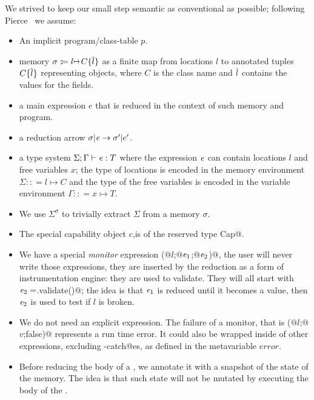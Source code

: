 \noindent We strived to keep our small step semantic as conventional as possible; following Pierce~\cite{pierce2002types} we assume:
\begin{itemize}
\item An implicit program/class-table $p$.
\item memory $\sigma:\!:\!= l\mapsto C\{\Many{l}\}$ as a finite map from locations $l$ to annotated tuples $C\{\hspace{0.03ex} \overline{\hspace{-0.03ex}l\hspace{-0.03ex}} \hspace{0.03ex}\}$ representing objects,
where $C$ is the class name and $\hspace{0.03ex} \overline{\hspace{-0.03ex}l\hspace{-0.03ex}} \hspace{0.03ex}$ contains the values for the fields.
\item a main expression $e$ that is reduced in the context of such memory and program.
\item a reduction arrow $\sigma|\e\rightarrow \sigma'|e'$.
\item a type system $\Sigma;\Gamma\vdash\e:T$ where 
the expression ${\mathit{e}}$ can contain locations $l$ and free variables $x$;
the type of locations is encoded in the memory environment $\Sigma:\!:\!= l\mapsto C$
and the type of the free variables is encoded in the variable environment $\Gamma:\!:\!= x\mapsto T$.
\item We use $\Sigma^\sigma$ to trivially extract $\Sigma$ from a memory $\sigma$.
\item The special capability object $c$,is of the reserved type
\Q@mut Cap@.
\item We have a special \emph{monitor} expression \Q@M(@$l$\Q@;@${\mathit{e}}_1$\Q@;@${\mathit{e}}_2$\Q@)@,
the user will never write those expressions, they are inserted by the reduction as
a form of instrumentation engine: they are used to validate.
They will all start with ${\mathit{e}}_2=$\Q@l.validate()@;
the idea is that ${\mathit{e}}_1$ is reduced until it becomes a value, then
${\mathit{e}}_2$ is used to test if $l$ is broken.
\item We do not need an explicit \Q@error@  expression.
The failure of a monitor, that is 
\Q@M(@$l$\Q@;@$v$\Q@;false)@ represents a run time error. It could also be wrapped inside
of other expressions, excluding \Q@try-catch@es, as defined in the metavariable $\mathit{error}$.
\item Before reducing the body of a \Q@try@, we annotate it with a snapshot of 
the state of the memory. The idea is that such state will not be mutated by executing
the body of the \Q@try@.

\end{itemize}

